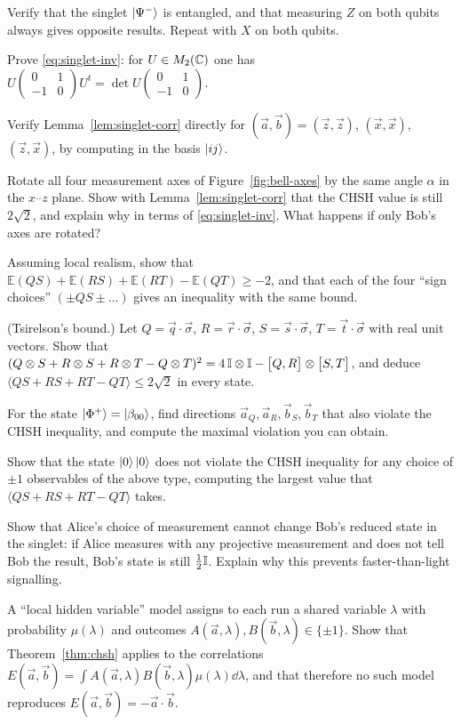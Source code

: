 \begin{exerciseset}
   Verify that the singlet $\left|\Psi^-\right\rangle$ is entangled, and that measuring $Z$ on both qubits always gives opposite results. Repeat with $X$ on both qubits.

   Prove \eqref{eq:singlet-inv}: for $U\in M_2(\mathbb{C})$ one has $U\begin{pmatrix}0&1\\-1&0\end{pmatrix}U^t=\det U\begin{pmatrix}0&1\\-1&0\end{pmatrix}$.

   Verify Lemma~\ref{lem:singlet-corr} directly for $(\vec a,\vec b)=(\vec z,\vec z)$, $(\vec x,\vec x)$, $(\vec z,\vec x)$, by computing in the basis $\left|ij\right\rangle$.

   Rotate all four measurement axes of Figure~\ref{fig:bell-axes} by the same angle $\alpha$ in the $x$--$z$ plane. Show with Lemma~\ref{lem:singlet-corr} that the CHSH value is still $2\sqrt2$, and explain why in terms of \eqref{eq:singlet-inv}. What happens if only Bob's axes are rotated?

   Assuming local realism, show that $\mathbb E(QS)+\mathbb E(RS)+\mathbb E(RT)-\mathbb E(QT)\ge-2$, and that each of the four ``sign choices'' $(\pm QS\pm\dots)$ gives an inequality with the same bound.

   (Tsirelson's bound.) Let $Q=\vec q\cdot\vec\sigma$, $R=\vec r\cdot\vec\sigma$, $S=\vec s\cdot\vec\sigma$, $T=\vec t\cdot\vec\sigma$ with real unit vectors. Show that $(Q\otimes S+R\otimes S+R\otimes T-Q\otimes T)^2=4\,\mathbb{I}\otimes\mathbb{I}-\bigl[Q,R\bigr]\otimes\bigl[S,T\bigr]$, and deduce $\langle QS+RS+RT-QT\rangle\le2\sqrt2$ in every state.\label{ex:tsirelson}

   For the state $\left|\Phi^+\right\rangle=\left|\beta_{00}\right\rangle$, find directions $\vec a_Q,\vec a_R,\vec b_S,\vec b_T$ that also violate the CHSH inequality, and compute the maximal violation you can obtain.

   Show that the state $\left|0\right\rangle\left|0\right\rangle$ does not violate the CHSH inequality for any choice of $\pm1$ observables of the above type, computing the largest value that $\langle QS+RS+RT-QT\rangle$ takes.

   Show that Alice's choice of measurement cannot change Bob's reduced state in the singlet: if Alice measures with any projective measurement and does not tell Bob the result, Bob's state is still $\tfrac12\mathbb{I}$. Explain why this prevents faster-than-light signalling.\label{ex:no-signalling}

   A ``local hidden variable'' model assigns to each run a shared variable $\lambda$ with probability $\mu(\lambda)$ and outcomes $A(\vec a,\lambda),B(\vec b,\lambda)\in\{\pm1\}$. Show that Theorem~\ref{thm:chsh} applies to the correlations $E(\vec a,\vec b)=\int A(\vec a,\lambda)B(\vec b,\lambda)\mu(\lambda)\dd\lambda$, and that therefore no such model reproduces $E(\vec a,\vec b)=-\vec a\cdot\vec b$.
\end{exerciseset}
